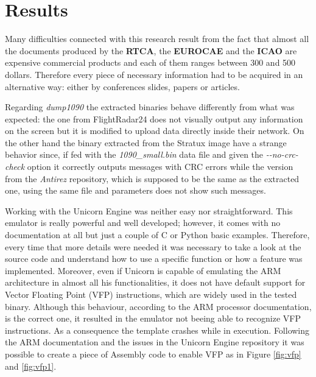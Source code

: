 \documentclass[../main.tex]{subfiles}
\begin{document}
\chapter{Results}
\label{chap:resconc}


Many difficulties connected with this research result from the fact that almost all the documents produced by the \textbf{RTCA}, the \textbf{EUROCAE} and the \textbf{ICAO} are expensive commercial products and each of them ranges between 300 and 500 dollars. Therefore every piece of necessary information had to be acquired in an alternative way: either by conferences slides, papers or articles.

Regarding \textit{dump1090} the extracted binaries behave differently from what was expected: the one from FlightRadar24 does not visually output any information on the screen but it is modified to upload data directly inside their network. On the other hand the binary extracted from the Stratux image have a strange behavior since, if fed with the \textit{1090\_small.bin} data file and given the \textit{-{}-no-crc-check} option it correctly outputs messages with CRC errors while the version from the \textit{Antirez} repository, which is supposed to be the same as the extracted one, using the same file and parameters does not show such messages.

Working with the Unicorn Engine was neither easy nor straightforward. This emulator is really powerful and well developed; however, it comes with no documentation at all but just a couple of C or Python basic examples. Therefore, every time that more details were needed it was necessary to take a look at the source code and understand how to use a specific function or how a feature was implemented. Moreover, even if Unicorn is capable of emulating the ARM architecture in almost all his functionalities, it does not have default support for Vector Floating Point (VFP) instructions, which are widely used in the tested binary. Although this behaviour, according to the ARM processor documentation, is the correct one, it resulted in the emulator not beeing able to recognize VFP instructions. As a consequence the template crashes while in execution. Following the ARM documentation and the issues in the Unicorn Engine repository it was possible to create a piece of Assembly code to enable VFP as in Figure \ref{fig:vfp} and \ref{fig:vfp1}.
\end{document}
